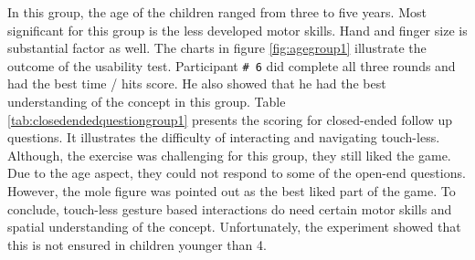 
In this group, the age of the children ranged from three to five years. Most significant for this group is the less developed motor skills. Hand and finger size is substantial factor as well. 
The charts in figure \ref{fig:agegroup1} illustrate the outcome of the usability test. Participant \texttt{\# 6} did complete all three rounds and had the best time / hits score. He also showed that he had the best understanding of the concept in this group.
Table \ref{tab:closedendedquestiongroup1} presents the scoring for closed-ended follow up questions. It illustrates the difficulty of interacting and navigating touch-less. Although, the exercise was challenging for this group, they still liked the game.
Due to the age aspect, they could not respond to some of the open-end questions. However, the mole figure was pointed out as the best liked part of the game.
To conclude, touch-less gesture based interactions do need certain motor skills and spatial understanding of the concept. Unfortunately, the experiment showed that this is not ensured in children younger than 4.   


